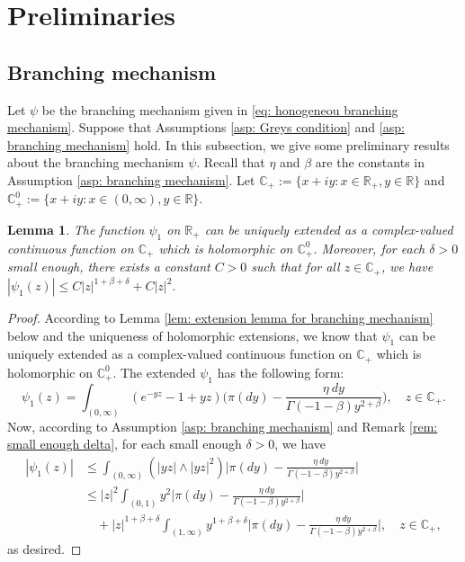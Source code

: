 \documentclass[12pt,a4paper]{amsart}
\theoremstyle{plain}
\newtheorem{lem}[thm]{Lemma}
\theoremstyle{definition}
\numberwithin{equation}{section}
\begin{document}
\section{Preliminaries}
\subsection{Branching mechanism}
\label{sec: branching mechanism}
	Let $\psi$ be the branching mechanism given in \eqref{eq: honogeneou branching mechanism}.
	Suppose that Assumptions \ref{asp: Greys condition} and \ref{asp: branching mechanism} hold.
	In this subsection, we give some preliminary results about the branching mechanism $\psi$.
	Recall that $\eta$ and $\beta$ are the constants in Assumption \ref{asp: branching mechanism}.
	Let $\mathbb C_+:= \{x+iy: x\in \mathbb R_+, y \in \mathbb R\}$ and $\mathbb C^0_+:= \{x+iy: x\in (0,\infty), y \in \mathbb R\}$.
\begin{lem}
\label{lem: complex extension for psi1}
	The function $\psi_1$ on $\mathbb R_+$ can be uniquely extended as a complex-valued continuous function on $\mathbb C_+$ which is holomorphic on $\mathbb C^0_+$.
		Moreover, for each $\delta > 0$ small enough, there exists a  constant $C>0$ such that for all $z\in \mathbb C_+$, we have
$
	|\psi_1(z)| \leq C |z|^{1+\beta+\delta} + C|z|^2.
$
\end{lem}
\begin{proof}
According to Lemma \ref{lem: extension lemma for branching mechanism} below and
the uniqueness of holomorphic extensions,
	we know that $\psi_1$ can be uniquely extended as a complex-valued continuous function on $\mathbb C_+$ which is holomorphic on $\mathbb C^0_+$.
	The extended $\psi_1$ has the following form:
\[
	\psi_1(z)= \int_{(0,\infty)}(e^{-yz}-1+yz) \Big(\pi(dy) - \frac{\eta~dy}{\Gamma(-1-\beta)y^{2+\beta}}\Big),
	\quad z\in \mathbb C_+.
\]
	Now, according to  Assumption \ref{asp: branching mechanism} and Remark \ref{rem: small enough delta}, for each small enough $\delta > 0$, we have
\begin{align}
	|\psi_1(z)|
	&\leq \int_{(0,\infty)} (|yz|\wedge |yz|^2) \Big|\pi(dy) - \frac{\eta~dy}{\Gamma(-1-\beta)y^{2+\beta}}\Big|
	\\&\leq  |z|^2\int_{(0,1)} y^2 \Big|\pi(dy) - \frac{\eta~dy}{\Gamma(-1-\beta)y^{2+\beta}}\Big|
	\\&\quad + |z|^{1+\beta +\delta}\int_{(1,\infty)} y^{1+\beta + \delta} \Big|\pi(dy) - \frac{\eta~dy}{\Gamma(-1-\beta)y^{2+\beta}}\Big|,
    \quad z \in \mathbb C_+,
\end{align}
	as desired.
\end{proof}
\end{document}
